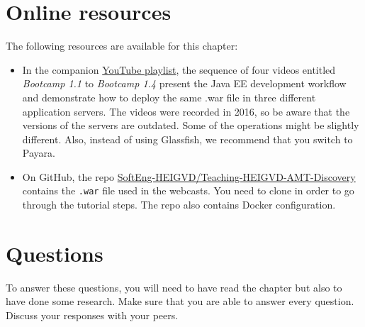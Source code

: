 \section{Online resources}

The following resources are available for this chapter:

\begin{itemize}
\item In the companion \href{https://www.youtube.com/playlist?list=PLfKkysTy70QaWqP7sD6xiqFvLZemVLQw_}{YouTube playlist}, the sequence of four videos entitled \emph{Bootcamp 1.1} to \emph{Bootcamp 1.4} present the Java EE development workflow and demonstrate how to deploy the same .war file in three different application servers. The videos were recorded in 2016, so be aware that the versions of the servers are outdated. Some of the operations might be slightly different. Also, instead of using Glassfish, we recommend that you switch to Payara.
\item On GitHub, the repo \href{https://github.com/SoftEng-HEIGVD/Teaching-HEIGVD-AMT-Discovery}{SoftEng-HEIGVD/Teaching-HEIGVD-AMT-Discovery} contains the \texttt{.war} file used in the webcasts. You need to clone in order to go through the tutorial steps. The repo also contains Docker configuration.
\end{itemize}

\section{Questions}

To answer these questions, you will need to have read the chapter but also to have done some research. Make sure that you are able to answer every question. Discuss your responses with your peers.

